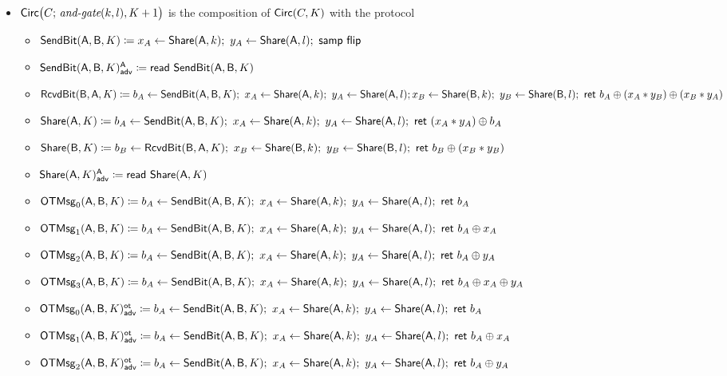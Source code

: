 \begin{itemize}
\item $\mathsf{Circ}\big(C; \, \textit{and-gate}(k,l),K+1\big)$ is the composition of $\mathsf{Circ}(C,K)$ with the protocol
\begin{itemize}
\item $\SendBit(\A,\B,K) \coloneqq x_A \leftarrow \Share(\A,k); \ y_A \leftarrow \Share(\A,l); \ \samp{\flip}$
\item {\color{blue} $\mathsf{SendBit}(\mathsf{A},\mathsf{B},K)^{\mathsf{A}}_{\mathsf{adv}} \coloneqq \mathsf{read} \ \mathsf{SendBit}(\mathsf{A},\mathsf{B},K)$}\smallskip
\item $\mathsf{RcvdBit}(\mathsf{B},\mathsf{A},K) \coloneqq b_A \leftarrow \mathsf{SendBit}(\mathsf{A},\mathsf{B},K); \ x_A \leftarrow \mathsf{Share}(\mathsf{A},k); \ y_A \leftarrow \mathsf{Share}(\mathsf{A},l); \\ x_B \leftarrow \mathsf{Share}(\mathsf{B},k); \ y_B \leftarrow \mathsf{Share}(\mathsf{B},l); \ \mathsf{ret} \ b_A \oplus (x_A * y_B) \oplus (x_B * y_A)$\smallskip
\item $\mathsf{Share}(\mathsf{A},K) \coloneqq b_A \leftarrow \mathsf{SendBit}(\mathsf{A},\mathsf{B},K); \ x_A \leftarrow \mathsf{Share}(\mathsf{A},k); \ y_A \leftarrow \mathsf{Share}(\mathsf{A},l); \ \mathsf{ret} \ (x_A * y_A) \oplus b_A$
\item $\mathsf{Share}(\mathsf{B},K) \coloneqq b_B \leftarrow \mathsf{RcvdBit}(\mathsf{B},\mathsf{A},K); \ x_B \leftarrow \mathsf{Share}(\mathsf{B},k); \ y_B \leftarrow \mathsf{Share}(\mathsf{B},l); \ \mathsf{ret} \ b_B \oplus (x_B * y_B)$
\item {\color{blue} $\mathsf{Share}(\mathsf{A},K)^{\mathsf{A}}_{\mathsf{adv}} \coloneqq \mathsf{read} \ \mathsf{Share}(\mathsf{A},K)$}\smallskip
\item $\mathsf{OTMsg}_0(\mathsf{A},\mathsf{B},K) \coloneqq b_A \leftarrow \mathsf{SendBit}(\mathsf{A},\mathsf{B},K); \ x_A \leftarrow \mathsf{Share}(\mathsf{A},k); \ y_A \leftarrow \mathsf{Share}(\mathsf{A},l); \ \mathsf{ret} \ b_A$
\item $\mathsf{OTMsg}_1(\mathsf{A},\mathsf{B},K) \coloneqq b_A \leftarrow \mathsf{SendBit}(\mathsf{A},\mathsf{B},K); \ x_A \leftarrow \mathsf{Share}(\mathsf{A},k); \ y_A \leftarrow \mathsf{Share}(\mathsf{A},l); \ \mathsf{ret} \ b_A \oplus x_A$
\item $\mathsf{OTMsg}_2(\mathsf{A},\mathsf{B},K) \coloneqq b_A \leftarrow \mathsf{SendBit}(\mathsf{A},\mathsf{B},K); \ x_A \leftarrow \mathsf{Share}(\mathsf{A},k); \ y_A \leftarrow \mathsf{Share}(\mathsf{A},l); \ \mathsf{ret} \ b_A \oplus y_A$
\item $\mathsf{OTMsg}_3(\mathsf{A},\mathsf{B},K) \coloneqq b_A \leftarrow \mathsf{SendBit}(\mathsf{A},\mathsf{B},K); \ x_A \leftarrow \mathsf{Share}(\mathsf{A},k); \ y_A \leftarrow \mathsf{Share}(\mathsf{A},l); \ \mathsf{ret} \ b_A \oplus x_A \oplus y_A$\smallskip
\item {\color{blue} $\LeakOTMsg_0(\A,\B,K)^\ot_\adv \coloneqq b_A \leftarrow \SendBit(\A,\B,K); \ x_A \leftarrow \Share(\A,k); \ y_A \leftarrow \Share(\A,l); \ \ret{b_A}$}
\item {\color{blue} $\mathsf{OTMsg}_1(\mathsf{A},\mathsf{B},K)^{\mathsf{ot}}_{\mathsf{adv}} \coloneqq b_A \leftarrow \mathsf{SendBit}(\mathsf{A},\mathsf{B},K); \ x_A \leftarrow \mathsf{Share}(\mathsf{A},k); \ y_A \leftarrow \mathsf{Share}(\mathsf{A},l); \ \mathsf{ret} \ b_A \oplus x_A$}
\item {\color{blue} $\mathsf{OTMsg}_2(\mathsf{A},\mathsf{B},K)^{\mathsf{ot}}_{\mathsf{adv}} \coloneqq b_A \leftarrow \mathsf{SendBit}(\mathsf{A},\mathsf{B},K); \ x_A \leftarrow \mathsf{Share}(\mathsf{A},k); \ y_A \leftarrow \mathsf{Share}(\mathsf{A},l); \ \mathsf{ret} \ b_A \oplus y_A$}

\end{itemize}
\end{itemize}

